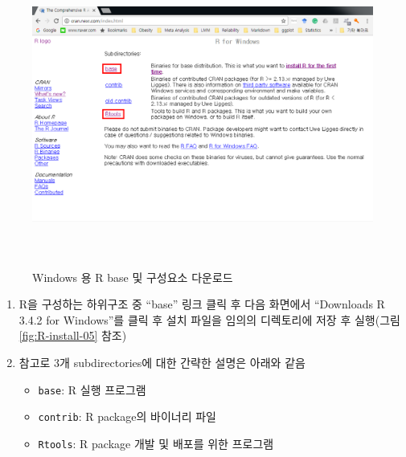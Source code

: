\documentclass[12pt,a4paper]{book}
\providecommand{\tightlist}{%
  \setlength{\itemsep}{0pt}\setlength{\parskip}{0pt}}
\theoremstyle{definition}
\theoremstyle{definition}
\theoremstyle{definition}
\theoremstyle{remark}
\begin{document}
\begin{figure}[H]
{
  \centering
  \includegraphics[width = 12cm, height = 10cm]{Figures/Rinstall-02.png}
  \caption[Windows 용 R base 및 구성요소 다운로드]{Windows 용 R base 및 구성요소 다운로드}\label{fig:R-install-04}
}
\end{figure}

\begin{enumerate}
\def\labelenumi{\arabic{enumi}.}
\setcounter{enumi}{5}
\item
  R을 구성하는 하위구조 중 ``base'' 링크 클릭 후 다음 화면에서
  ``Downloads R 3.4.2 for Windows''를 클릭 후 설치 파일을 임의의
  디렉토리에 저장 후 실행(그림 \ref{fig:R-install-05} 참조)
\item
  참고로 3개 subdirectories에 대한 간략한 설명은 아래와 같음

  \begin{itemize}
  \tightlist
  \item
    \texttt{base}: R 실행 프로그램
  \item
    \texttt{contrib}: R package의 바이너리 파일
  \item
    \texttt{Rtools}: R package 개발 및 배포를 위한 프로그램
  \end{itemize}
\end{enumerate}
\end{document}
